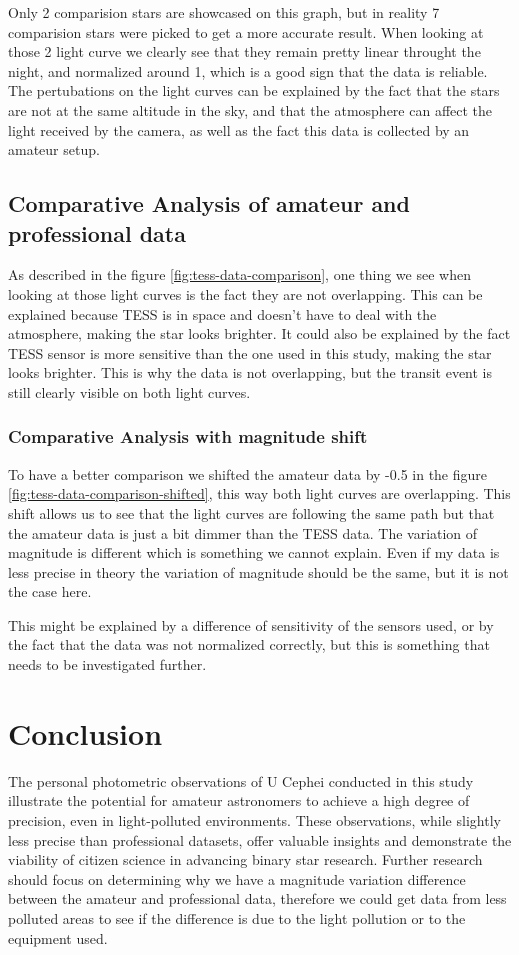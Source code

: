 \documentclass[12pt,a4paper]{article}
\begin{document}
Only 2 comparision stars are showcased on this graph, but in reality 7 comparision stars were picked to get a more accurate result. When looking at those 2 light curve we clearly see that they remain pretty linear throught the night,
and normalized around 1, which is a good sign that the data is reliable. The pertubations on the light curves can be explained by the fact that the stars are not at the same altitude in the sky, and that the atmosphere can affect the light received by the camera, as well as the fact
this data is collected by an amateur setup.

\subsection{Comparative Analysis of amateur and professional data}


As described in the figure \ref{fig:tess-data-comparison}, one thing we see when looking at those light curves is the fact they are not overlapping. This can be explained because TESS is in space and doesn't have to deal with the atmosphere, making the star looks brighter. It could also be explained by the fact
TESS sensor is more sensitive than the one used in this study, making the star looks brighter. This is why the data is not overlapping, but the transit event is still clearly visible on both light curves.

\subsubsection{Comparative Analysis with magnitude shift}

To have a better comparison we shifted the amateur data by -0.5 in the figure \ref{fig:tess-data-comparison-shifted}, this way both light curves are overlapping. This shift allows us to see that the light curves are following the same path but that the amateur data is just a bit dimmer than the TESS data.
The variation of magnitude is different which is something we cannot explain. Even if my data is less precise in theory the variation of magnitude should be the same, but it is not the case here.

This might be explained by a difference of sensitivity of the sensors used, or by the fact that the data was not normalized correctly, but this is something that needs to be investigated further.

\section{Conclusion}
The personal photometric observations of U Cephei conducted in this study illustrate the potential for amateur astronomers to achieve a high degree of precision, 
even in light-polluted environments. These observations, while slightly less precise than professional datasets, 
offer valuable insights and demonstrate the viability of citizen science in advancing binary star research. 
Further research should focus on determining why we have a magnitude variation difference between the amateur and professional data,
therefore we could get data from less polluted areas to see if the difference is due to the light pollution or to the equipment used.
\end{document}
